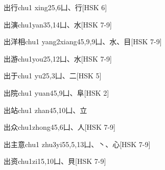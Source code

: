\begin{EntryWithPhonetic}{出行}{chu1 xing2}{5,6}{⼐、⾏}[HSK 6]
\end{EntryWithPhonetic}

\begin{EntryWithPhonetic}{出演}{chu1yan3}{5,14}{⼐、⽔}[HSK 7-9]
\end{EntryWithPhonetic}

\begin{EntryWithPhonetic}{出洋相}{chu1 yang2xiang4}{5,9,9}{⼐、⽔、⽬}[HSK 7-9]
\end{EntryWithPhonetic}

\begin{EntryWithPhonetic}{出游}{chu1you2}{5,12}{⼐、⽔}[HSK 7-9]
\end{EntryWithPhonetic}

\begin{EntryWithPhonetic}{出于}{chu1 yu2}{5,3}{⼐、⼆}[HSK 5]
\end{EntryWithPhonetic}

\begin{EntryWithPhonetic}{出院}{chu1 yuan4}{5,9}{⼐、⾩}[HSK 2]
\end{EntryWithPhonetic}

\begin{EntryWithPhonetic}{出站}{chu1 zhan4}{5,10}{⼐、⽴}
\end{EntryWithPhonetic}

\begin{EntryWithPhonetic}{出众}{chu1zhong4}{5,6}{⼐、⼈}[HSK 7-9]
\end{EntryWithPhonetic}

\begin{EntryWithPhonetic}{出主意}{chu1 zhu3yi5}{5,5,13}{⼐、⼂、⼼}[HSK 7-9]
\end{EntryWithPhonetic}

\begin{EntryWithPhonetic}{出资}{chu1zi1}{5,10}{⼐、⾙}[HSK 7-9]
\end{EntryWithPhonetic}

